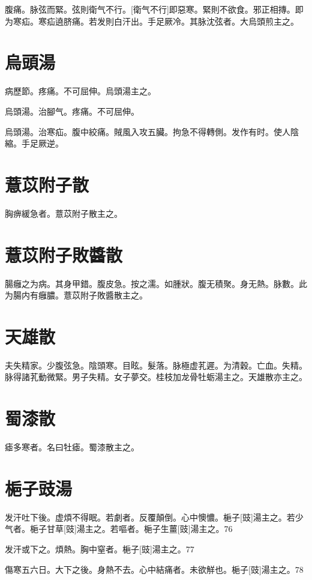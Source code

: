 \documentclass[12pt,oneside,UTF8,b5paper]{ctexbook}她她她她她她她
\begin{document}
腹痛。脉弦而緊。弦則衛气不行。[衛气不行]即惡寒。緊則不欲食。邪正相摶。即为寒疝。寒疝遶脐痛。若发則白汗出。手足厥冷。其脉沈弦者。大烏頭煎主之。

\section{烏頭湯}

病歷節。疼痛。不可屈伸。烏頭湯主之。

烏頭湯。治腳气。疼痛。不可屈伸。

烏頭湯。治寒疝。腹中絞痛。賊風入攻五臟。拘急不得轉側。发作有时。使人陰縮。手足厥逆。

\section{薏苡附子散}

胸痹緩急者。薏苡附子散主之。

\section{薏苡附子敗醬散}

腸癰之为病。其身甲錯。腹皮急。按之濡。如腫狀。腹无積聚。身无熱。脉數。此为腸内有癰膿。薏苡附子敗醬散主之。

\section{天雄散}

夫失精家。少腹弦急。陰頭寒。目眩。髮落。脉極虚芤遲。为清穀。亡血。失精。脉得諸芤動微緊。男子失精。女子夢交。桂枝加龙骨牡蛎湯主之。天雄散亦主之。

\section{蜀漆散}

瘧多寒者。名曰牡瘧。蜀漆散主之。

\section{梔子豉湯}

发汗吐下後。虚煩不得眠。若劇者。反覆顛倒。心中懊憹。梔子[豉]湯主之。若少气者。梔子甘草[豉]湯主之。若嘔者。梔子生薑[豉]湯主之。76

发汗或下之。煩熱。胸中窒者。梔子[豉]湯主之。77

傷寒五六日。大下之後。身熱不去。心中結痛者。未欲觧也。梔子[豉]湯主之。78
\end{document}
